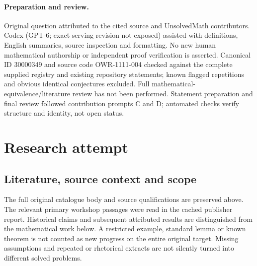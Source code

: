\documentclass[11pt]{article}
\begin{document}
\paragraph{Preparation and review.}
Original question attributed to the cited source and UnsolvedMath contributors. Codex (GPT-6; exact serving revision not exposed) assisted with definitions, English summaries, source inspection and formatting. No new human mathematical authorship or independent proof verification is asserted. Canonical ID 30000349 and source code OWR-1111-004 checked against the complete supplied registry and existing repository statements; known flagged repetitions and obvious identical conjectures excluded. Full mathematical-equivalence/literature review has not been performed. Statement preparation and final review followed contribution prompts C and D; automated checks verify structure and identity, not open status.
\label{end:30000349}

\section{Research attempt}
\subsection{Literature, source context and scope}
The full original catalogue body and source qualifications are preserved above. The relevant primary workshop passages were read in the cached publisher report. Historical claims and subsequent attributed results are distinguished from the mathematical work below. A restricted example, standard lemma or known theorem is not counted as new progress on the entire original target. Missing assumptions and repeated or rhetorical extracts are not silently turned into different solved problems.
\end{document}
